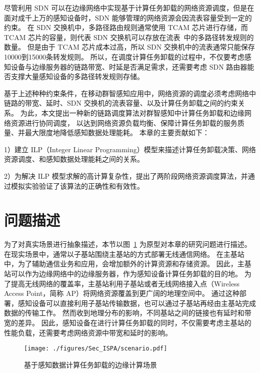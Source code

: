 尽管利用 SDN 可以在边缘网络中实现基于计算任务卸载的网络资源调度，但是在面对成千上万的感知设备时，SDN 能够管理的网络资源会因流表容量受到一定的约束。
在 SDN 交换机中，多路径路由规则通常使用 TCAM 芯片进行存储，而 TCAM 芯片的容量，则代表 SDN 交换机可以存放在流表~\cite{Dasgupta:2012:DMD:2400771.2401550}中的多路径转发规则的数量。
但是由于 TCAM 芯片成本过高，所以 SDN 交换机中的流表通常只能保存10000到15000条转发规则。
所以，在调度计算任务卸载的过程中，不仅要考虑感知设备与边缘服务器的链路带宽、时延是否满足需求，还需要考虑 SDN 路由器能否支撑大量感知设备的多路径转发规则存储。

基于上述种种约束条件，在移动群智感知应用中，网络资源的调度必须考虑网络中链路的带宽、延时、SDN 交换机的流表容量、以及计算任务卸载之间的约束关系。
为此，本文提出一种新的链路调度算法对群智感知中计算任务卸载和边缘网络资源进行协同调度，
以达到网络资源负载均衡、保障计算任务卸载的服务质量、并最大限度地降低感知数据处理能耗。
本章的主要贡献如下：

1）建立 ILP（Integer Linear Programming）模型来描述计算任务卸载决策、网络资源调度、和感知数据处理能耗之间的关系。

2）为解决 ILP 模型求解的高计算复杂性，提出了两阶段网络资源调度算法，并通过模拟实验验证了该算法的正确性和有效性。

\section{问题描述}

为了对真实场景进行抽象描述，本节以图~\ref{fig_scenario} 为原型对本章的研究问题进行描述。
在现实场景中，通常以子基站围绕主基站的方式部署无线通信网络。
在主基站中，为了辅助通信业务和应用，会增加额外的计算资源和存储资源。
因此，主基站可以作为边缘网络中的边缘服务器，作为感知设备计算任务卸载的目的地。
为了提高无线网络的覆盖率，主基站利用子基站或者无线网络接入点（Wireless Access Point，简称 AP）将网络资源覆盖到更广阔的地理空间中。
通过这种部署，感知设备可以直接利用子基站传输数据，也可以通过子基站再经由主基站完成数据的传输工作。
然而收到地理分布的影响，不同基站之间的链接也有延时和带宽的差异。
因此，感知设备在进行计算任务卸载的同时，不仅需要考虑主基站的性能负载，还需要考虑网络资源中带宽和延时的影响。

\begin{figure}[!h]
  \centering
  \texttt{[image: ./figures/Sec\_ISPA/scenario.pdf]}
  \vspace{-1em}
  \caption{基于感知数据计算任务卸载的边缘计算场景}
  \label{fig_scenario}
\end{figure}

